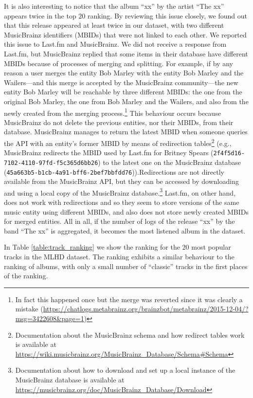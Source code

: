 It is also interesting to notice that the album ``xx'' by the artist ``The xx'' appears twice in the top 20 ranking. By reviewing this issue closely, we found out that this release appeared at least twice in our dataset, with two different MusicBrainz identifiers (MBIDs) that were not linked to each other.
We reported this issue to Last.fm and MusicBrainz. We did not receive a response from Last.fm, but MusicBrainz replied that some items in their database have  different MBIDs because of processes of merging and splitting. 
For example, if by any reason a user merges the entity Bob Marley with the entity Bob Marley and the Wailers---and this merge is accepted by the MusicBrainz community---the new entity Bob Marley will be reachable by three different MBIDs: the one from the original Bob Marley, the one from Bob Marley and the Wailers, and also from the newly created from the merging process.\footnote{In fact this happened once but the merge was reverted since it was clearly a mistake (\url{https://chatlogs.metabrainz.org/brainzbot/metabrainz/2015-12-04/?msg=3422608&page=1})} 
This behaviour occurs because MusicBrainz do not delete the previous entities, nor their MBIDs, from their database.
MusicBrainz manages to return the latest MBID when someone queries the API with an entity's former MBID by means of redirection tables\footnote{Documentation about the MusicBrainz schema and how redirect tables work is available at \url{https://wiki.musicbrainz.org/MusicBrainz_Database/Schema#Schema}} (e.g., MusicBrainz redirects the MBID used by Last.fm for Britney Spears (\texttt{2f4f5d16-7102-4110-97fd-f5c365d6bb26}) to the latest one on the MusicBrainz database (\texttt{45a663b5-b1cb-4a91-bff6-2bef7bbfdd76})).\linebreak Redirections are not directly available from the MusicBrainz API, but they can be accessed by downloading and using a local copy of the MusicBrainz data\-base.\footnote{Documentation about how to download and set up a local instance of the MusicBrainz database is available at \url{https://musicbrainz.org/doc/MusicBrainz_Database/Download}}
Last.fm, on other hand, does not work with redirections and so they seem to store versions of the same music entity using different MBIDs, and also does not store newly created MBIDs for merged entities.
All in all, if the number of logs of the release ``xx'' by the band ``The xx'' is aggregated, it becomes the most listened album in the dataset. 


 In Table \ref{table:track_ranking} we show the ranking for the 20 most popular tracks in the MLHD dataset. The ranking exhibits a similar behaviour to the ranking of albums, with only a small number of ``classic'' tracks in the first places of the ranking.

